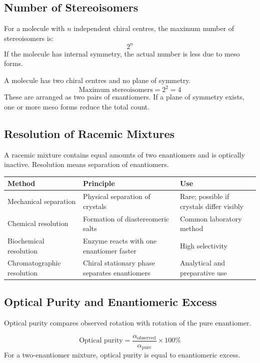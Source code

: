 \documentclass[12pt,a4paper]{article}
\begin{document}
\subsection{Number of Stereoisomers}
For a molecule with $n$ independent chiral centres, the maximum number of stereoisomers is:
\[
2^n
\]
If the molecule has internal symmetry, the actual number is less due to meso forms.

\begin{tcolorbox}[examplebox, title={Solved Example: Number of Stereoisomers}]
A molecule has two chiral centres and no plane of symmetry.
\[
\text{Maximum stereoisomers}=2^2=4
\]
These are arranged as two pairs of enantiomers. If a plane of symmetry exists, one or more meso forms reduce the total count.
\end{tcolorbox}

\subsection{Resolution of Racemic Mixtures}
A racemic mixture contains equal amounts of two enantiomers and is optically inactive. Resolution means separation of enantiomers.

\begin{tabularx}{\linewidth}{|B{3.2cm}|Y|Y|}
\hline
\textbf{Method} & \textbf{Principle} & \textbf{Use} \\
\hline
Mechanical separation & Physical separation of crystals & Rare; possible if crystals differ visibly \\
\hline
Chemical resolution & Formation of diastereomeric salts & Common laboratory method \\
\hline
Biochemical resolution & Enzyme reacts with one enantiomer faster & High selectivity \\
\hline
Chromatographic resolution & Chiral stationary phase separates enantiomers & Analytical and preparative use \\
\hline
\end{tabularx}

\subsection{Optical Purity and Enantiomeric Excess}
Optical purity compares observed rotation with rotation of the pure enantiomer.

\begin{tcolorbox}[formulabox, title={Optical Purity}]
\[
\text{Optical purity}=\frac{\alpha_{\mathrm{observed}}}{\alpha_{\mathrm{pure}}}\times100\%
\]
For a two-enantiomer mixture, optical purity is equal to enantiomeric excess.
\end{tcolorbox}
\end{document}
